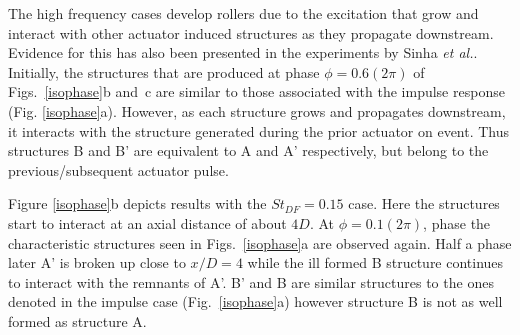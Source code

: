 \documentclass[english]{aiaa-tc}
\begin{document}
The high frequency cases develop rollers due to the excitation that
grow and interact with other actuator induced structures as they
propagate downstream. Evidence for this has also been presented in the
experiments by Sinha {\em et al.}\cite{sinha2013}. Initially, the structures that
are produced at phase $\phi=0.6(2\pi)$ of Figs.~\ref{isophase}b and~c
are similar to those associated with the impulse response (Fig.
\ref{isophase}a).  However, as each structure grows and propagates downstream,
it interacts with the structure generated during the prior actuator on event.
Thus structures B and B' are equivalent to A and A' respectively, but belong
to the previous/subsequent actuator pulse.

Figure \ref{isophase}b depicts results with the $St_{DF}=0.15$ case.
Here the structures start to interact at an axial distance of about
$4D$. At $\phi=0.1(2\pi)$, phase the characteristic structures seen in
Figs.~\ref{isophase}a are observed again. Half a phase later A' is
broken up close to $x/D=4$ while the ill formed B structure continues
to interact with the remnants of A'. B' and B are similar structures
to the ones denoted in the impulse case (Fig.~\ref{isophase}a) however
structure B is not as well formed as structure A. 
\end{document}
